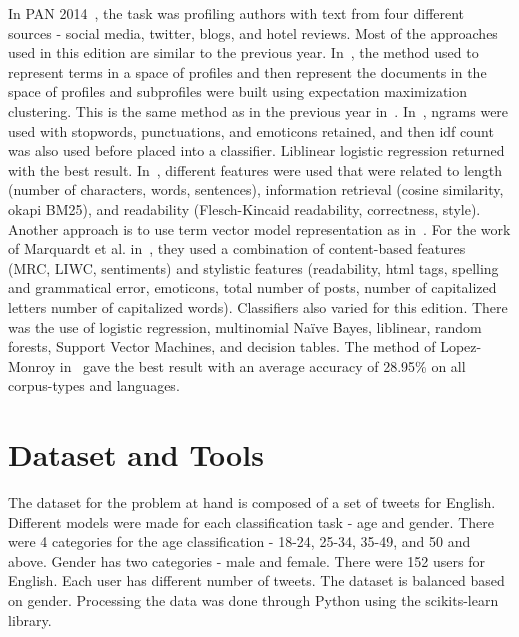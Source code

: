 \documentclass[a4paper]{llncs}
\begin{document}
In PAN 2014~\cite{rangel2014overview}, the task was profiling authors with text from four different sources - social media, twitter, blogs, and hotel reviews. Most of the approaches used in this edition are similar to the previous year. In~\cite{lopezusing}, the method used to represent terms in a space of profiles and then represent the documents in the space of profiles and subprofiles were built using expectation maximization clustering. This is the same method as in the previous year in~\cite{lopez2013inaoe}. In~\cite{maharjansimple}, ngrams were used with stopwords, punctuations, and emoticons retained, and then idf count was also used before placed into a classifier. Liblinear logistic regression returned with the best result. In~\cite{weren6exploring}, different features were used that were related to length (number of characters, words, sentences), information retrieval (cosine similarity, okapi BM25), and readability (Flesch-Kincaid readability, correctness, style). Another approach is to use term vector model representation as in~\cite{villenadaedalus}. For the work of Marquardt et al. in~\cite{marquardt2014age}, they used a combination of content-based features (MRC, LIWC, sentiments) and stylistic features (readability, html tags, spelling and grammatical error, emoticons, total number of posts, number of capitalized letters number of capitalized words). Classifiers also varied for this edition. There was the use of logistic regression, multinomial Naïve Bayes, liblinear, random forests, Support Vector Machines, and decision tables. The method of Lopez-Monroy in~\cite{lopezusing} gave the best result with an average accuracy of 28.95\% on all corpus-types and languages. 

\section{Dataset and Tools}
The dataset for the problem at hand is composed of a set of tweets for English. Different models were made for each classification task - age and gender. There were 4 categories for the age classification - 18-24, 25-34, 35-49, and 50 and above. Gender has two categories - male and female. There were 152 users for English. Each user has different number of tweets. The dataset is balanced based on gender. Processing the data was done through Python using the scikits-learn~\cite{scikit-learn} library. 
\end{document}
